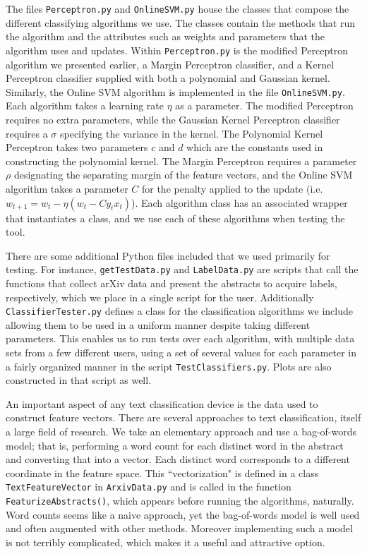 \documentclass[12pt]{article}
\begin{document}
The files {\tt Perceptron.py} and {\tt OnlineSVM.py} house the classes that compose the different classifying algorithms we use.
The classes contain the methods that run the algorithm and the attributes such as weights and parameters that the algorithm uses and updates.
Within {\tt Perceptron.py} is the modified Perceptron algorithm we presented earlier, a Margin Perceptron classifier, and a Kernel Perceptron classifier supplied with both a polynomial and Gaussian kernel.
Similarly, the Online SVM algorithm is implemented in the file {\tt OnlineSVM.py}.
Each algorithm takes a learning rate $\eta$ as a parameter. The modified Perceptron requires no extra parameters, while the Gaussian Kernel Perceptron classifier requires a $\sigma$ specifying the variance in the kernel.
The Polynomial Kernel Perceptron takes two parameters $c$ and $d$ which are the constants used in constructing the polynomial kernel.
The Margin Perceptron requires a parameter $\rho$ designating the separating margin of the feature vectors, and the Online SVM algorithm takes a parameter $C$ for the penalty applied to the update (i.e. $w_{t+1} = w_t -\eta(w_t- Cy_tx_t)$).
Each algorithm class has an associated wrapper that instantiates a class, and we use each of these algorithms when testing the tool.

There are some additional Python files included that we used primarily for testing. For instance, {\tt getTestData.py} and {\tt LabelData.py} are scripts that call the functions that collect arXiv data and present the abstracts to acquire labels, respectively, which we place in a single script for the user. Additionally {\tt ClassifierTester.py} defines a class for the classification algorithms we include allowing them to be used in a uniform manner despite taking different parameters. This enables us to run tests over each algorithm, with multiple data sets from a few different users, using a set of several values for each parameter in a fairly organized manner in the script {\tt TestClassifiers.py}. Plots are also constructed in that script as well.

An important aspect of any text classification device is the data used to construct feature vectors. There are several approaches to text classification, itself a large field of research. We take an elementary approach and use a bag-of-words model; that is, performing a word count for each distinct word in the abstract and converting that into a vector. 
Each distinct word corresponds to a different coordinate in the feature space. This ``vectorization" is defined in a class {\tt TextFeatureVector} in {\tt ArxivData.py} and is called in the function {\tt FeaturizeAbstracts()}, which appears before running the algorithms, naturally. Word counts seems like a naive approach, yet the bag-of-words model is well used and often augmented with other methods. Moreover implementing such a model is not terribly complicated, which makes it a useful and attractive option. 
\end{document}
